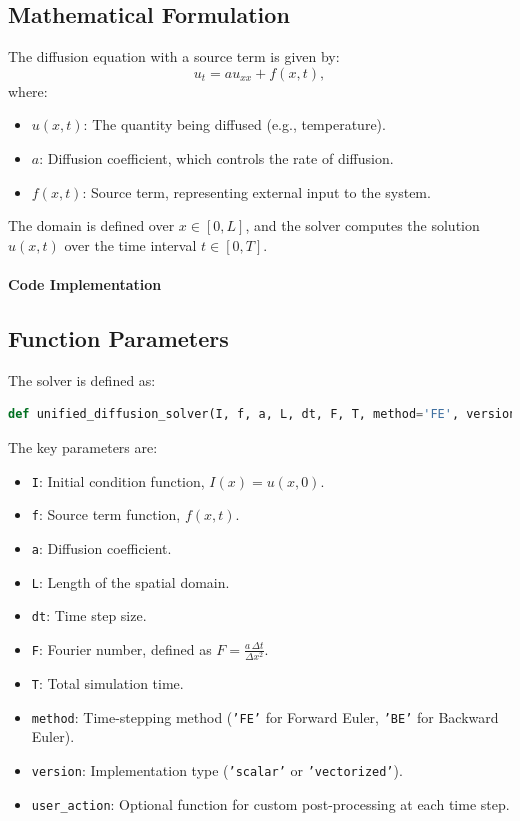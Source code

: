 \documentclass{article}
\begin{document}
		\subsection{Mathematical Formulation}
		
			The diffusion equation with a source term is given by:
			\[
			u_t = a u_{xx} + f(x, t),
			\]
			where:
			\begin{itemize}
				\item \( u(x, t) \): The quantity being diffused (e.g., temperature).
				\item \( a \): Diffusion coefficient, which controls the rate of diffusion.
				\item \( f(x, t) \): Source term, representing external input to the system.
			\end{itemize}
			
			The domain is defined over \( x \in [0, L] \), and the solver computes the solution \( u(x, t) \) over the time interval \( t \in [0, T] \).
			
			\paragraph{Code Implementation}
			
			\subsection{Function Parameters}
			
			The solver is defined as:
			
			\begin{lstlisting}[language=Python]
				def unified_diffusion_solver(I, f, a, L, dt, F, T, method='FE', version='scalar', user_action=None):
			\end{lstlisting}
			
			The key parameters are:
			\begin{itemize}
				\item \texttt{I}: Initial condition function, \( I(x) = u(x, 0) \).
				\item \texttt{f}: Source term function, \( f(x, t) \).
				\item \texttt{a}: Diffusion coefficient.
				\item \texttt{L}: Length of the spatial domain.
				\item \texttt{dt}: Time step size.
				\item \texttt{F}: Fourier number, defined as \( F = \frac{a \, \Delta t}{\Delta x^2} \).
				\item \texttt{T}: Total simulation time.
				\item \texttt{method}: Time-stepping method (\texttt{'FE'} for Forward Euler, \texttt{'BE'} for Backward Euler).
				\item \texttt{version}: Implementation type (\texttt{'scalar'} or \texttt{'vectorized'}).
				\item \texttt{user\_action}: Optional function for custom post-processing at each time step.
			\end{itemize}
		
\end{document}
